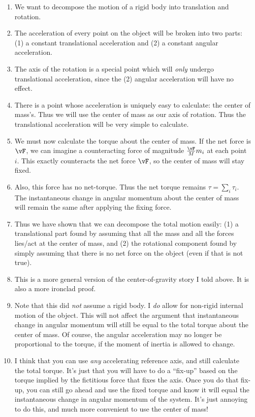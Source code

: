 \begin{enumerate}
  \item We want to decompose the motion of a rigid body into translation
  and rotation.

  \item The acceleration of every point on the object will be broken
  into two parts: (1) a constant translational acceleration and (2)
  a constant angular acceleration.

  \item The axis of the rotation is a special point which will
  \emph{only} undergo translational acceleration, since the (2) angular
  acceleration will have no effect.

  \item There is a point whose acceleration is uniquely easy to
  calculate: the center of mass's. Thus we will use the center of mass
  as our axis of rotation. Thus the translational acceleration will be
  very simple to calculate.

  \item We must now calculate the torque about the center of mass. If
  the net force is $\vF$, we can imagine a counteracting force of
  magnitude $\frac{\vF}{M}m_i$ at each point $i$. This exactly
  counteracts the net force $\vF$, so the center of mass will stay
  fixed.

  \item Also, this force has no net-torque. Thus the net torque remains
  $\tau = \sum_i \tau_i$. The instantaneous change in angular momentum
  about the center of mass will remain the same after applying the
  fixing force.

  \item Thus we have shown that we can decompose the total motion
  easily: (1) a translational part found by assuming that all the mass
  and all the forces lies/act at the center of mass, and (2) the
  rotational component found by simply assuming that there is no net
  force on the object (even if that is not true).

  \item This is a more general version of the center-of-gravity story I
  told above. It is also a more ironclad proof.

  \item Note that this did \emph{not} assume a rigid body. I \emph{do}
  allow for non-rigid internal motion of the object. This will not
  affect the argument that instantaneous change in angular momentum will
  still be equal to the total torque about the center of mass. Of
  course, the angular acceleration may no longer be proportional to the
  torque, if the moment of inertia is allowed to change.

  \item I think that you can use \emph{any} accelerating reference axis,
  and still calculate the total torque. It's just that you will have to
  do a ``fix-up'' based on the torque implied by the fictitious force
  that fixes the axis. Once you do that fix-up, you can still go ahead
  and use the fixed torque and know it will equal the instantaneous
  change in angular momentum of the system. It's just annoying to do
  this, and much more convenient to use the center of mass!
\end{enumerate}
